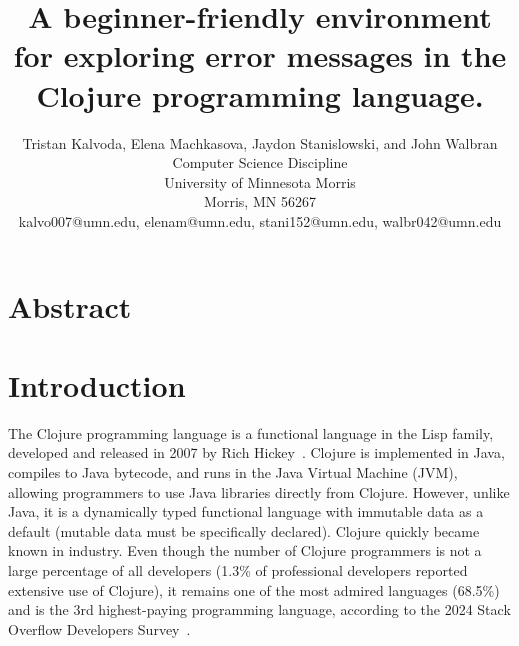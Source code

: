 \documentclass[12pt]{article}
\newcommand{\comment}[1]{{\bf \tt  {#1}}}
\begin{document}
\pagestyle{plain}
%

\title{A beginner-friendly environment for exploring error messages in the Clojure programming language.}
%
%

\author{
Tristan Kalvoda, Elena Machkasova, Jaydon Stanislowski, and John Walbran\\
Computer Science Discipline \\
University of Minnesota Morris\\
Morris, MN 56267\\
kalvo007@umn.edu, elenam@umn.edu, stani152@umn.edu, walbr042@umn.edu
}
\date{}
\maketitle
\thispagestyle{empty}

\section*{\centering Abstract}


\newpage
\setcounter{page}{1}

\section{Introduction}
The Clojure programming language is a functional language in the Lisp family, developed and released in 2007 
by Rich Hickey~\cite{Hickey:2008}. 
Clojure is implemented in Java, compiles to Java bytecode, and runs in the Java Virtual Machine (JVM), 
allowing programmers to use Java libraries directly from Clojure. 
However, unlike Java, it is a dynamically typed functional language with immutable data as a default (mutable data 
must be specifically declared).
Clojure quickly became known in industry. Even though the number of Clojure programmers is not a large percentage
of all developers (1.3\% of professional developers reported extensive use of Clojure), it remains one of the most admired languages (68.5\%) and is the 3rd highest-paying programming language, according to the 2024 Stack Overflow Developers Survey~\cite{survey}.
\end{document}
